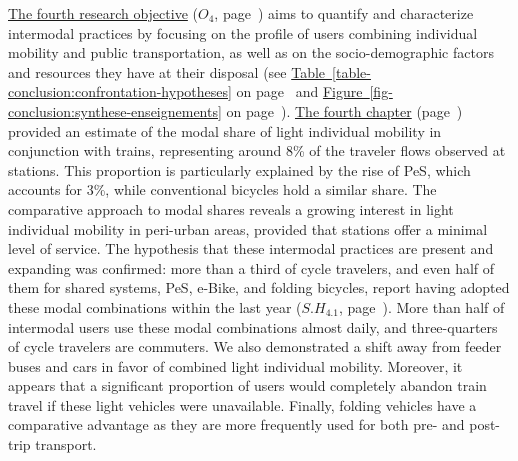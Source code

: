 \begin{refsegment}
\hyperref[objectif-4]{The fourth research objective} (\(O_4\), page~\pageref{objectif-4}) aims to quantify and characterize intermodal practices by focusing on the profile of users combining individual mobility and public transportation, as well as on the socio-demographic factors and resources they have at their disposal (see \hyperref[table-conclusion:confrontation-hypotheses]{Table~\ref{table-conclusion:confrontation-hypotheses}} on page~\pageref{table-conclusion:confrontation-hypotheses} and \hyperref[fig-conclusion:synthese-enseignements]{Figure~\ref{fig-conclusion:synthese-enseignements}} on page~\pageref{fig-conclusion:synthese-enseignements}). \hyperref[chap4:titre]{The fourth chapter} (page~\pageref{chap4:titre}) provided an estimate of the modal share of light individual mobility in conjunction with trains, representing around 8\% of the traveler flows observed at stations. This proportion is particularly explained by the rise of \acrfull{PeS}, which accounts for 3\%, while conventional bicycles hold a similar share. The comparative approach to modal shares reveals a growing interest in light individual mobility in peri-urban areas, provided that stations offer a minimal level of service. The hypothesis that these intermodal practices are present and expanding was confirmed: more than a third of cycle travelers, and even half of them for shared systems, \acrshort{PeS}, \acrfull{e-Bike}, and folding bicycles, report having adopted these modal combinations within the last year (\hyperref[sous-hypothese-4.1]{\(S.H_{4.1}\)}, page~\pageref{sous-hypothese-4.1}). More than half of intermodal users use these modal combinations almost daily, and three-quarters of cycle travelers are commuters. We also demonstrated a shift away from feeder buses and cars in favor of combined light individual mobility. Moreover, it appears that a significant proportion of users would completely abandon train travel if these light vehicles were unavailable. Finally, folding vehicles have a comparative advantage as they are more frequently used for both pre- and post-trip transport.%


\end{refsegment}
